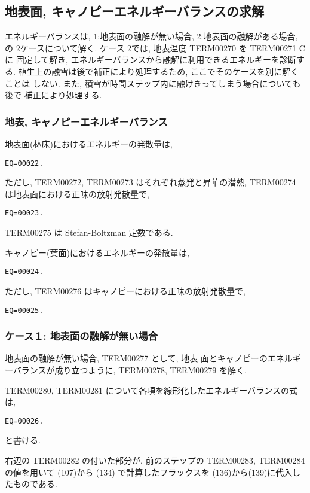 \subsection{地表面, キャノピーエネルギーバランスの求解}

エネルギーバランスは, 1:地表面の融解が無い場合, 2:地表面の融解がある場合,
の 2ケースについて解く. ケース 2では, 地表温度 TERM00270 を TERM00271 Cに
固定して解き, エネルギーバランスから融解に利用できるエネルギーを診断する.
植生上の融雪は後で補正により処理するため, ここでそのケースを別に解くことは
しない.
また, 積雪が時間ステップ内に融けきってしまう場合についても後で
補正により処理する.

\subsubsection{地表, キャノピーエネルギーバランス}

 地表面(林床)におけるエネルギーの発散量は,
 \begin{verbatim}
EQ=00022.
\end{verbatim}
 ただし, TERM00272, TERM00273 はそれぞれ蒸発と昇華の潜熱,
 TERM00274 は地表面における正味の放射発散量で,
 \begin{verbatim}
EQ=00023.
\end{verbatim}
 TERM00275 は Stefan-Boltzman 定数である.

 キャノピー(葉面)におけるエネルギーの発散量は,
 \begin{verbatim}
EQ=00024.
\end{verbatim}
 ただし, TERM00276 はキャノピーにおける正味の放射発散量で,
 \begin{verbatim}
EQ=00025.
\end{verbatim}

\subsubsection{ケース１: 地表面の融解が無い場合}

地表面の融解が無い場合, TERM00277 として, 地表
面とキャノピーのエネルギーバランスが成り立つように, TERM00278, TERM00279 を解く.

TERM00280, TERM00281 について各項を線形化したエネルギーバランスの式は,

\begin{verbatim}
EQ=00026.
\end{verbatim}
と書ける.

右辺の TERM00282 の付いた部分が,
前のステップの TERM00283, TERM00284 の値を用いて (107)から
(134) で計算したフラックスを
(136)から(139)に代入したものである.

